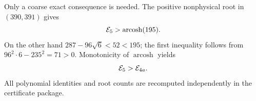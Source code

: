 Only a coarse exact consequence is needed.  The positive nonphysical root in
\((390,391)\) gives
\begin{equation}\label{eq:E5-lower}
 \mathcal E_5>\operatorname{arcosh}(195).
\end{equation}
On the other hand
\(287-96\sqrt6<52<195\); the first inequality follows from
\(96^2\cdot6-235^2=71>0\).  Monotonicity of \(\operatorname{arcosh}\) yields
\begin{equation}\label{eq:E5-E4a}
 \mathcal E_5>\mathcal E_{4a}.
\end{equation}
All polynomial identities and root counts are recomputed independently in
the certificate package.
